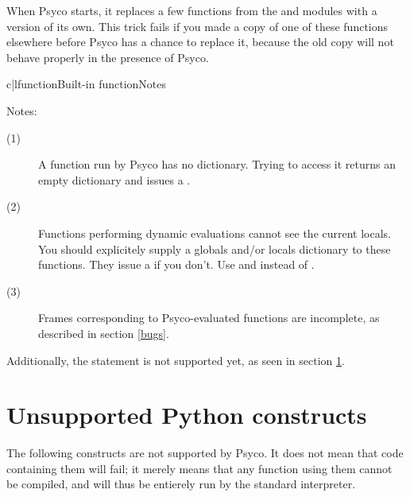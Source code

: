 \documentclass{manual}
\begin{document}
When Psyco starts, it replaces a few functions from the  and  modules with a version of its own.  This trick fails if you made a copy of one of these functions elsewhere before Psyco has a chance to replace it, because the old copy will not behave properly in the presence of Psyco.

%
\begin{tableii}{c|l}{function}{Built-in function}{Notes}
\end{tableii}

\noindent
Notes:
%
\begin{description}
\item[(1)]
  A function run by Psyco has no  dictionary.  Trying to access it returns an empty dictionary and issues a .
\item[(2)]
  Functions performing dynamic evaluations cannot see the current locals.  You should explicitely supply a globals and/or locals dictionary to these functions.  They issue a  if you don't.  Use  and  instead of .
\item[(3)]
  Frames corresponding to Psyco-evaluated functions are incomplete, as described in section \ref{bugs}.
\end{description}

Additionally, the  statement is not supported yet, as seen in section \ref{unsupported}.


\section{Unsupported Python constructs}\label{unsupported}

The following constructs are not supported by Psyco.  It does not mean that code containing them will fail; it merely means that any function using them cannot be compiled, and will thus be entierely run by the standard interpreter.
\end{document}
